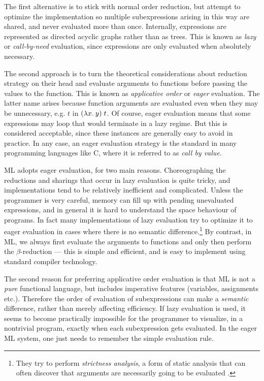 The first alternative is to stick with normal order reduction, but attempt to
optimize the implementation so multiple subexpressions arising in this way are
shared, and never evaluated more than once. Internally, expressions are
represented as directed acyclic graphs rather than as trees. This is known as
{\em lazy} or {\em call-by-need} evaluation, since expressions are only
evaluated when absolutely necessary.

The second approach is to turn the theoretical considerations about reduction
strategy on their head and evaluate arguments to functions before passing the
values to the function. This is known as {\em applicative order} or {\em eager}
evaluation. The latter name arises because function arguments are evaluated
even when they may be unnecessary, e.g. $t$ in $(\lambda x.\: y)\; t$. Of course,
eager evaluation means that some expressions may loop that would terminate in a
lazy regime. But this is considered acceptable, since these instances are
generally easy to avoid in practice. In any case, an eager evaluation strategy
is the standard in many programming languages like C, where it is referred to
as {\em call by value}.

ML adopts eager evaluation, for two main reasons. Choreographing the reductions
and sharings that occur in lazy evaluation is quite tricky, and implementations
tend to be relatively inefficient and complicated. Unless the programmer is
very careful, memory can fill up with pending unevaluated expressions, and in
general it is hard to understand the space behaviour of programs. In fact many
implementations of lazy evaluation try to optimize it to eager evaluation in
cases where there is no semantic difference.\footnote{They try to perform {\em
strictness analysis}, a form of static analysis that can often discover that
arguments are necessarily going to be evaluated \cite{mycroft-thesis}.} By
contrast, in ML, we always first evaluate the arguments to functions and only
then perform the $\beta$-reduction --- this is simple and efficient, and is
easy to implement using standard compiler technology.

The second reason for preferring applicative order evaluation is that ML is not
a {\em pure} functional language, but includes imperative features (variables,
assignments etc.). Therefore the order of evaluation of subexpressions can make
a {\em semantic} difference, rather than merely affecting efficiency. If lazy
evaluation is used, it seems to become practically impossible for the
programmer to visualize, in a nontrivial program, exactly when each
subexpression gets evaluated. In the eager ML system, one just needs to
remember the simple evaluation rule.

